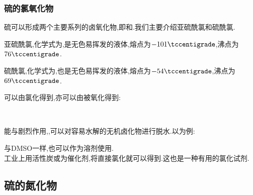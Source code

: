 \documentclass{ctexart}
\begin{document}
\subsubsection{硫的氯氧化物}
硫可以形成两个主要系列的卤氧化物,即和.我们主要介绍亚硫酰氯和硫酰氯.
\begin{substance}[\ce{SOCl2}]
    亚硫酰氯,化学式为,是无色易挥发的液体,熔点为$-101\tccentigrade$,沸点为$76\tccentigrade$.
\end{substance}
\begin{substance}[\ce{SO2Cl2}]
    硫酰氯,化学式为,也是无色易挥发的液体,熔点为$-54\tccentigrade$,沸点为$69\tccentigrade$.
\end{substance}
可以由氯化得到,亦可以由被氧化得到:
\begin{center}
    \\
\end{center}
能与剧烈作用,,可以对容易水解的无机卤化物进行脱水.以为例:
\begin{center}
\end{center}
与DMSO一样,也可以作为溶剂使用.\\
\indent 工业上用活性炭或为催化剂,将直接氯化就可以得到.这也是一种有用的氯化试剂.
\subsection{硫的氮化物}
\end{document}
